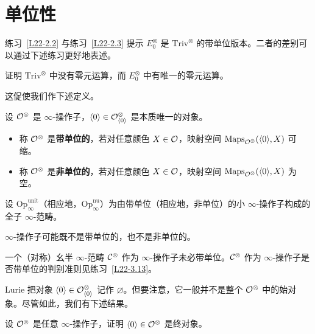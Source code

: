 \section{单位性}

\nitem\label{L22-3.1} 练习~\ref{L22-2.2} 与练习~\ref{L22-2.3} 提示 $E_{0}^{\otimes}$ 是 $\mathrm{Triv}^{\otimes}$ 的带单位版本。二者的差别可以通过下述练习更好地表述。

\begin{exercise}\label{L22-3.2}
证明 $\mathrm{Triv}^{\otimes}$ 中没有零元运算，而 $E_{0}^{\otimes}$ 中有唯一的零元运算。
\end{exercise}

\nitem\label{L22-3.3} 这促使我们作下述定义。

\begin{definition}\label{L22-3.4}
设 $\mathcal{O}^{\otimes}$ 是 $\infty$-操作子，$\langle0\rangle\in\mathcal{O}^{\otimes}_{\langle0\rangle}$ 是本质唯一的对象。
\begin{itemize}[leftmargin=2.2em,itemsep=0.1em]
\item 称 $\mathcal{O}^{\otimes}$ 是\textbf{带单位的}，若对任意颜色 $X\in\mathcal{O}$，映射空间 $\operatorname{Maps}_{\mathcal{O}^{\otimes}}(\langle0\rangle,X)$ 可缩。
\item 称 $\mathcal{O}^{\otimes}$ 是\textbf{非单位的}，若对任意颜色 $X\in\mathcal{O}$，映射空间 $\operatorname{Maps}_{\mathcal{O}^{\otimes}}(\langle0\rangle,X)$ 为空。
\end{itemize}
设 $\mathrm{Op}_{\infty}^{\mathrm{unit}}$（相应地，$\mathrm{Op}_{\infty}^{\mathrm{nu}}$）为由带单位（相应地，非单位）的小 $\infty$-操作子构成的全子 $\infty$-范畴。
\end{definition}

\begin{warning}\label{L22-3.5}
$\infty$-操作子可能既不是带单位的，也不是非单位的。
\end{warning}

\begin{warning}\label{L22-3.6}
一个（对称）幺半 $\infty$-范畴 $\mathcal{C}^{\otimes}$ 作为 $\infty$-操作子未必带单位。$\mathcal{C}^{\otimes}$ 作为 $\infty$-操作子是否带单位的判别准则见练习~\ref{L22-3.13}。
\end{warning}

\nitem\label{L22-3.7} Lurie 把对象 $\langle0\rangle\in\mathcal{O}^{\otimes}_{\langle0\rangle}$ 记作 $\varnothing$。但要注意，它一般并不是整个 $\mathcal{O}^{\otimes}$ 中的始对象。尽管如此，我们有下述结果。

\begin{exercise}\label{L22-3.8}
设 $\mathcal{O}^{\otimes}$ 是任意 $\infty$-操作子，证明 $\langle0\rangle\in\mathcal{O}^{\otimes}$ 是终对象。
\end{exercise}

